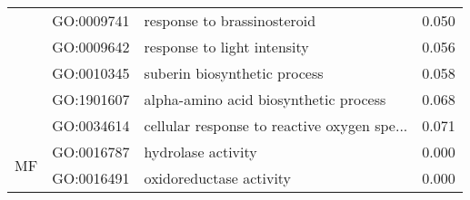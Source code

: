 \begin{longtable}{lllr}
   & GO:0009741 &                  response to brassinosteroid &         0.050 \\
   & GO:0009642 &                  response to light intensity &         0.056 \\
   & GO:0010345 &                 suberin biosynthetic process &         0.058 \\
   & GO:1901607 &        alpha-amino acid biosynthetic process &         0.068 \\
   & GO:0034614 &  cellular response to reactive oxygen spe... &         0.071 \\
\cline{1-4}
\multirow{2}{*}{MF} & GO:0016787 &                           hydrolase activity &         0.000 \\
   & GO:0016491 &                      oxidoreductase activity &         0.000 \\
\end{longtable}
